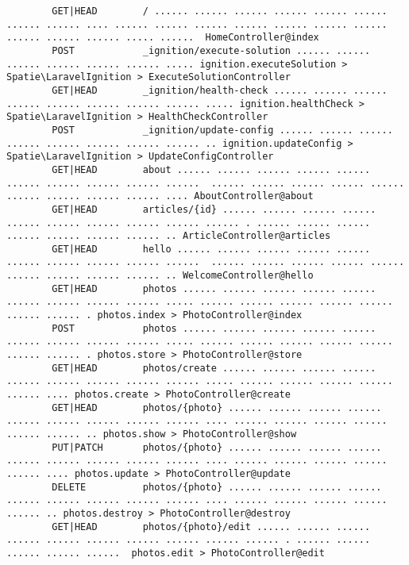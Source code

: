 \documentclass[12pt,titlepage]{article}
\begin{document}
\begin{enumerate}[label=\alph*.]
\begin{verbatim}
        GET|HEAD        / ...... ...... ...... ...... ...... ...... ...... ...... .... ...... ...... ...... ...... ...... ...... ...... ...... ...... ...... ..... ......  HomeController@index
        POST            _ignition/execute-solution ...... ...... ...... ...... ...... ...... ..... ignition.executeSolution > Spatie\LaravelIgnition > ExecuteSolutionController  
        GET|HEAD        _ignition/health-check ...... ...... ...... ...... ...... ...... ...... ...... ..... ignition.healthCheck > Spatie\LaravelIgnition > HealthCheckController  
        POST            _ignition/update-config ...... ...... ...... ...... ...... ...... ...... ...... .. ignition.updateConfig > Spatie\LaravelIgnition > UpdateConfigController  
        GET|HEAD        about ...... ...... ...... ...... ...... ...... ...... ...... ...... ......  ...... ...... ...... ...... ...... ...... ...... ...... ...... .... AboutController@about  
        GET|HEAD        articles/{id} ...... ...... ...... ...... ...... ...... ...... ...... ...... ...... . ...... ...... ...... ...... ...... ...... ...... .. ArticleController@articles  
        GET|HEAD        hello ...... ...... ...... ...... ...... ...... ...... ...... ...... ......  ...... ...... ...... ...... ...... ...... ...... ...... ...... .. WelcomeController@hello  
        GET|HEAD        photos ...... ...... ...... ...... ...... ...... ...... ...... ...... ..... ...... ...... ...... ...... ...... ...... ...... . photos.index > PhotoController@index  
        POST            photos ...... ...... ...... ...... ...... ...... ...... ...... ...... ..... ...... ...... ...... ...... ...... ...... ...... . photos.store > PhotoController@store  
        GET|HEAD        photos/create ...... ...... ...... ...... ...... ...... ...... ...... ...... ..... ...... ...... ...... ...... ...... .... photos.create > PhotoController@create  
        GET|HEAD        photos/{photo} ...... ...... ...... ...... ...... ...... ...... ...... ...... .... ...... ...... ...... ...... ...... ...... .. photos.show > PhotoController@show  
        PUT|PATCH       photos/{photo} ...... ...... ...... ...... ...... ...... ...... ...... ...... .... ...... ...... ...... ...... ...... .... photos.update > PhotoController@update  
        DELETE          photos/{photo} ...... ...... ...... ...... ...... ...... ...... ...... ...... .... ...... ...... ...... ...... ...... .. photos.destroy > PhotoController@destroy  
        GET|HEAD        photos/{photo}/edit ...... ...... ...... ...... ...... ...... ...... ...... ...... ...... . ...... ...... ...... ...... ......  photos.edit > PhotoController@edit  

\end{verbatim}
\end{enumerate}
\end{document}
